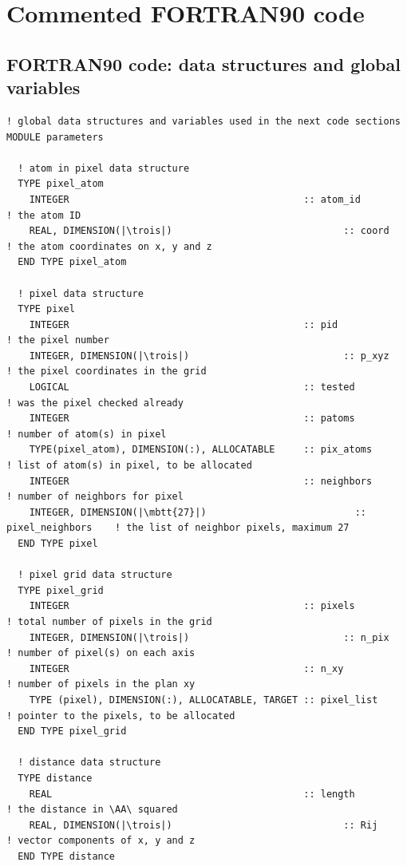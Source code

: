 \clearpage

\section{Commented FORTRAN90 code}

\subsection{FORTRAN90 code: data structures and global variables}
\label{f-pc-data}

\begin{lstlisting}[language={[90]FORTRAN}]
! global data structures and variables used in the next code sections
MODULE parameters
  
  ! atom in pixel data structure
  TYPE pixel_atom
    INTEGER                                         :: atom_id            ! the atom ID
    REAL, DIMENSION(|\trois|)                              :: coord              ! the atom coordinates on x, y and z
  END TYPE pixel_atom
  
  ! pixel data structure
  TYPE pixel
    INTEGER                                         :: pid                ! the pixel number
    INTEGER, DIMENSION(|\trois|)                           :: p_xyz              ! the pixel coordinates in the grid
    LOGICAL                                         :: tested             ! was the pixel checked already
    INTEGER                                         :: patoms             ! number of atom(s) in pixel
    TYPE(pixel_atom), DIMENSION(:), ALLOCATABLE     :: pix_atoms          ! list of atom(s) in pixel, to be allocated
    INTEGER                                         :: neighbors          ! number of neighbors for pixel
    INTEGER, DIMENSION(|\mbtt{27}|)                          :: pixel_neighbors    ! the list of neighbor pixels, maximum 27
  END TYPE pixel
  
  ! pixel grid data structure
  TYPE pixel_grid
    INTEGER                                         :: pixels             ! total number of pixels in the grid
    INTEGER, DIMENSION(|\trois|)                           :: n_pix              ! number of pixel(s) on each axis
    INTEGER                                         :: n_xy               ! number of pixels in the plan xy
    TYPE (pixel), DIMENSION(:), ALLOCATABLE, TARGET :: pixel_list         ! pointer to the pixels, to be allocated
  END TYPE pixel_grid
  
  ! distance data structure
  TYPE distance
    REAL                                            :: length             ! the distance in \AA\ squared
    REAL, DIMENSION(|\trois|)                              :: Rij                ! vector components of x, y and z
  END TYPE distance
  

\end{lstlisting}
